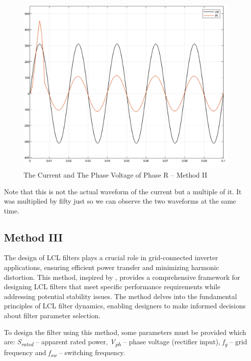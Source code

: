\documentclass[12pt,a4paper]{book}
\begin{document}
\begin{figure}[h!]
  \centering
  \includegraphics[width=11cm]{image23.png}
  \caption{The Current and The Phase Voltage of Phase R -- Method II}
  \label{fig:image23}
\end{figure}
Note that this is not the actual waveform of the current but a multiple of it. It was multiplied by fifty just so we can observe the two waveforms at the same time.

\subsection{Method III}
The design of LCL filters plays a crucial role in grid-connected inverter applications, ensuring efficient power transfer and minimizing harmonic distortion. This method, inspired by \cite{lcl2020}, provides a comprehensive framework for designing LCL filters that meet specific performance requirements while addressing potential stability issues. The method delves into the fundamental principles of LCL filter dynamics, enabling designers to make informed decisions about filter parameter selection.

To design the filter using this method, some parameters must be provided which are: \emph{S\textsubscript{rated}} -- apparent rated power, \emph{V\textsubscript{ph}} -- phase voltage (rectifier input), \emph{f\textsubscript{g}} -- grid frequency and \emph{f\textsubscript{sw}} -- switching frequency.
\end{document}
